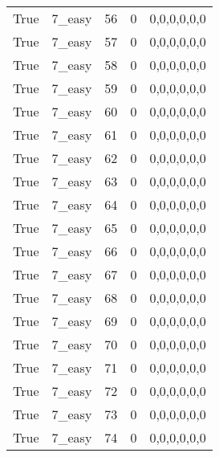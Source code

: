 \begin{tabular}{llrrl}
 True            & 7\_easy              &            56 &                     0 & 0,0,0,0,0,0   \\
 True            & 7\_easy              &            57 &                     0 & 0,0,0,0,0,0   \\
 True            & 7\_easy              &            58 &                     0 & 0,0,0,0,0,0   \\
 True            & 7\_easy              &            59 &                     0 & 0,0,0,0,0,0   \\
 True            & 7\_easy              &            60 &                     0 & 0,0,0,0,0,0   \\
 True            & 7\_easy              &            61 &                     0 & 0,0,0,0,0,0   \\
 True            & 7\_easy              &            62 &                     0 & 0,0,0,0,0,0   \\
 True            & 7\_easy              &            63 &                     0 & 0,0,0,0,0,0   \\
 True            & 7\_easy              &            64 &                     0 & 0,0,0,0,0,0   \\
 True            & 7\_easy              &            65 &                     0 & 0,0,0,0,0,0   \\
 True            & 7\_easy              &            66 &                     0 & 0,0,0,0,0,0   \\
 True            & 7\_easy              &            67 &                     0 & 0,0,0,0,0,0   \\
 True            & 7\_easy              &            68 &                     0 & 0,0,0,0,0,0   \\
 True            & 7\_easy              &            69 &                     0 & 0,0,0,0,0,0   \\
 True            & 7\_easy              &            70 &                     0 & 0,0,0,0,0,0   \\
 True            & 7\_easy              &            71 &                     0 & 0,0,0,0,0,0   \\
 True            & 7\_easy              &            72 &                     0 & 0,0,0,0,0,0   \\
 True            & 7\_easy              &            73 &                     0 & 0,0,0,0,0,0   \\
 True            & 7\_easy              &            74 &                     0 & 0,0,0,0,0,0   \\

\end{tabular}
